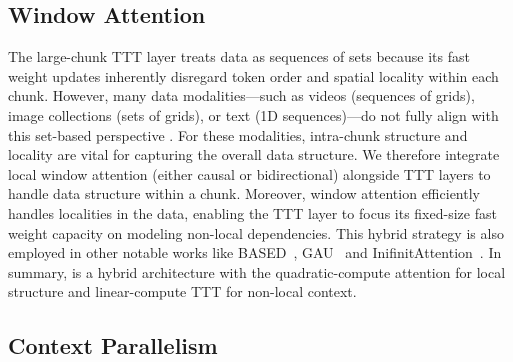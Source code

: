 


\subsection{Window Attention}
The large-chunk TTT layer treats data as sequences of sets because its fast weight updates inherently disregard token order and spatial locality within each chunk.
However, many data modalities—such as videos (sequences of grids), image collections (sets of grids), or text (1D sequences)—do not fully align with this set-based perspective .
For these modalities, intra-chunk structure and locality are vital for capturing the overall data structure. We therefore integrate local window attention (either causal or bidirectional) alongside TTT layers to handle data structure within a chunk. Moreover, window attention efficiently handles localities in the data, enabling the TTT layer to focus its fixed-size fast weight capacity on modeling non-local dependencies. This hybrid strategy is also employed in other notable works like BASED~\cite{arora2024simple}, GAU~\cite{hua2022transformer} and InifinitAttention~\cite{munkhdalai2024leavecontextbehindefficient}. 
In summary, \methodname{} is a hybrid architecture with the quadratic-compute attention for local structure and linear-compute TTT for non-local context.


\subsection{Context Parallelism}
\label{sec:parallelism}

